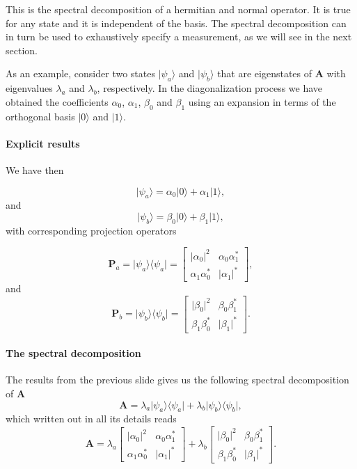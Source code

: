 This is the spectral decomposition of a hermitian and normal
operator. It is true for any state and it is independent of the
basis. The spectral decomposition can in turn be used to exhaustively
specify a measurement, as we will see in the next section.

As an example, consider two states $\vert \psi_a\rangle$ and $\vert
\psi_b\rangle$ that are eigenstates of $\bm{A}$ with eigenvalues
$\lambda_a$ and $\lambda_b$, respectively. In the diagonalization
process we have obtained the coefficients $\alpha_0$, $\alpha_1$,
$\beta_0$ and $\beta_1$ using an expansion in terms of the orthogonal
basis $\vert 0\rangle$ and $\vert 1\rangle$.


\paragraph{Explicit results}

We have then

\[
\vert \psi_a\rangle = \alpha_0\vert 0\rangle+\alpha_1\vert 1\rangle,
\]
and
\[
\vert \psi_b\rangle = \beta_0\vert 0\rangle+\beta_1\vert 1\rangle,
\]
with corresponding projection operators

\[
\bm{P}_a=\vert \psi_a\rangle \langle \psi_a\vert = \begin{bmatrix} \vert \alpha_0\vert^2 &\alpha_0\alpha_1^* \\
                                                                   \alpha_1\alpha_0^* & \vert \alpha_1\vert^* \end{bmatrix},
\]    
and
\[
\bm{P}_b=\vert \psi_b\rangle \langle \psi_b\vert = \begin{bmatrix} \vert \beta_0\vert^2 &\beta_0\beta_1^* \\
                                                                   \beta_1\beta_0^* & \vert \beta_1\vert^* \end{bmatrix}.
\]


\paragraph{The spectral decomposition}

The results from the previous slide gives us
the following spectral decomposition of $\bm{A}$
\[
\bm{A}=\lambda_a \vert \psi_a\rangle \langle \psi_a\vert+\lambda_b \vert \psi_b\rangle \langle \psi_b\vert,
\]
which written out in all its details reads
\[
\bm{A}=\lambda_a\begin{bmatrix} \vert \alpha_0\vert^2 &\alpha_0\alpha_1^* \\
                                                                   \alpha_1\alpha_0^* & \vert \alpha_1\vert^* \end{bmatrix} +\lambda_b\begin{bmatrix} \vert \beta_0\vert^2 &\beta_0\beta_1^* \\
                                                                   \beta_1\beta_0^* & \vert \beta_1\vert^* \end{bmatrix}.
\]


